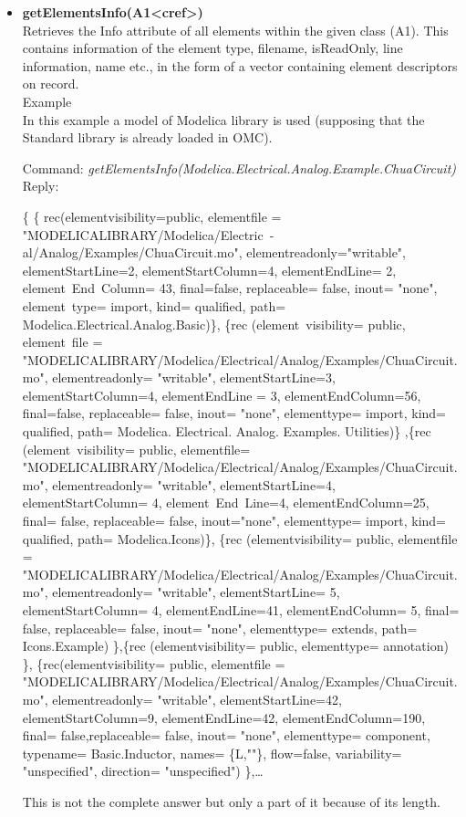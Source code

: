 \documentclass[11pt,a4paper,oneside,english]{book}
\newenvironment{modelicaExamples}{\begin{itemize}}{\end{itemize}}
\newcommand{\api}[2]{\item \textbf{#1} \\ #2}
\newcommand{\command}[1]{Command: \textit{#1}\\}
\newcommand{\reply}[1]{Reply: #1}
\newcommand{\functionex}[2]{\begin{singlespace} \command{#1} \reply{#2} \end{singlespace}}
\newcommand{\examples}{Example}
\begin{document}
\begin{modelicaExamples}
		\api{getElementsInfo(A1<cref>)}{Retrieves the Info attribute of all elements within the given class (A1).
This contains information of the element type, filename, isReadOnly, line information, name etc., in the form of a
 vector containing element de\-scrip\-tors on re\-cord.\\
 \examples \\
		In this example a model of Modelica library is used (supposing that the Standard library is already loaded
 in OMC).
		\functionex{getElementsInfo(Modelica.Electrical.Analog.Example.ChuaCir\-cuit)}
		{
\begin{scriptsize} \{ \{ rec(elementvisibility=public, elementfile = "MODELICALIBRARY/Modelica/Electric\
-al/Analog/Examples/ChuaCircuit.mo", elementreadonly="writable", elementStartLine=2, elementStartColumn=4,
 elementEndLine= 2, element~End~Column= 43, final=false, replaceable= false, inout= "no\-ne", element~type= import,
 kind= qualified, path= Modelica.Electrical.Analog.Basic)\}, \{rec (element~visibility= public, element~file =
 "MODELICALIBRARY/Modelica/Electrical/Analog/Examples/ChuaCir\-cuit.mo", elementreadonly= "writable",
 elementStartLine=3, elementStartColumn=4, elementEndLine = 3, elementEndColumn=56, final=false, replaceable= false,
 inout= "none", elementtype= import, kind= qualified, path= Modelica. Electrical. Analog. Examples. Utilities)\}
,\{rec (element~visibility= public, elementfile=
 "MODELICALIBRARY/Mo\-delica/Electrical/Analog/Examples/ChuaCircuit.mo", elementreadonly= "writable",
elementStartLine=4, elementStartColumn= 4, element~End~Line=4, elementEndColumn=25, final= false, replaceable=
false, inout="none", elementtype= import, kind= qualified, path= Modelica.Icons)\}, \{rec (e\-le\-ment\-vi\-si\-bi\-li\-ty=
public, elementfile = "MO\-DE\-LI\-CA\-LI\-BRA\-RY/Mo\-de\-li\-ca/E\-lectrical/A\-nalog/\-Examples/\-Chua\-Circuit.mo",  element\-read\-only=
 "wri\-ta\-ble",  e\-le\-ment\-Start\-Li\-ne= 5, e\-le\-me\-nt\-Start\-Co\-lumn= 4, e\-le\-me\-nt\-End\-Line=41, e\-le\-ment\-End\-Co\-lumn= 5, fi\-nal= fal\-se,
 replaceable= false, inout= "none", elementtype= extends, path= Icons.Example) \},\{rec (element\-visibility= public,
 element\-type= annotation) \}, \{rec(elementvisibility= public, elementfile =
 "MODELICALIBRARY/M\-odelica/E\-lectrical/A\-nalog/\-Examples/\-ChuaCircuit.mo", element\-read\-only= "wri\-ta\-ble",
 elementStartLine=42, elementStartColumn=9, elementEndLine=42, elementEndColumn=190, final= false,replaceable=
 fal\-se, inout= "none", elementtype= component, typename= Basic.Inductor, names= \{L,""\}, flow=false, variability=
"unspecified", direction= "unspecified") \},\dots
		\end{scriptsize} }
This is not the complete answer but only a part of it because of its length.}


\end{modelicaExamples}
\end{document}
